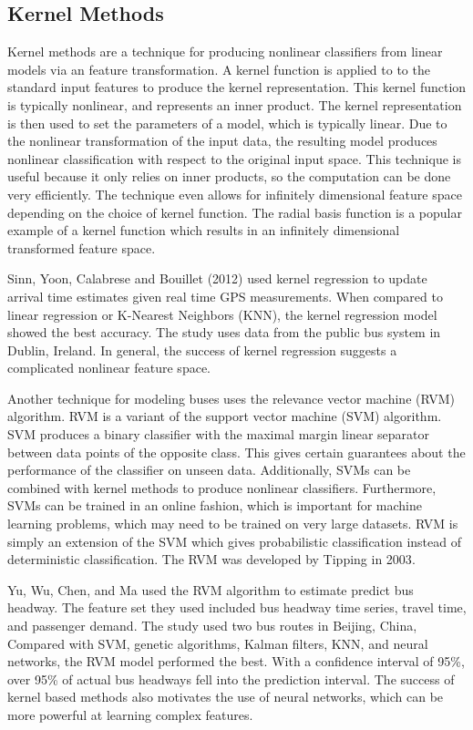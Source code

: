 \subsection{Kernel Methods}

Kernel methods are a technique for producing nonlinear classifiers from linear models via an feature transformation.
A kernel function is applied to to the standard input features to produce the kernel representation.
This kernel function is typically nonlinear, and represents an inner product.
The kernel representation is then used to set the parameters of a model, which is typically linear.
Due to the nonlinear transformation of the input data, the resulting model produces nonlinear classification with respect to the original input space.
This technique is useful because it only relies on inner products, so the computation can be done very efficiently.
The technique even allows for infinitely dimensional feature space depending on the choice of kernel function.
The radial basis function is a popular example of a kernel function which results in an infinitely dimensional transformed feature space.

Sinn, Yoon, Calabrese and Bouillet (2012) used kernel regression to update arrival time estimates given real time GPS measurements\cite{sinn2012predicting}.
When compared to linear regression or K-Nearest Neighbors (KNN), the kernel regression model showed the best accuracy.
The study uses data from the public bus system in Dublin, Ireland.
In general, the success of kernel regression suggests a complicated nonlinear feature space.

Another technique for modeling buses uses the relevance vector machine (RVM) algorithm.
RVM is a variant of the support vector machine (SVM) algorithm.
SVM produces a binary classifier with the maximal margin linear separator between data points of the opposite class.
This gives certain guarantees about the performance of the classifier on unseen data.
Additionally, SVMs can be combined with kernel methods to produce nonlinear classifiers.
Furthermore, SVMs can be trained in an online fashion, which is important for machine learning problems, which may need to be trained on very large datasets.
RVM is simply an extension of the SVM which gives probabilistic classification instead of deterministic classification.
The RVM was developed by Tipping in 2003\cite{tipping2003relevance}.

Yu, Wu, Chen, and Ma used the RVM algorithm to estimate predict bus headway\cite{yu2017probabilistic}.
The feature set they used included bus headway time series, travel time, and passenger demand.
The study used two bus routes in Beijing, China,
Compared with SVM, genetic algorithms, Kalman filters, KNN, and neural networks, the RVM model performed the best.
With a confidence interval of 95\%, over 95\% of actual bus headways fell into the prediction interval.
The success of kernel based methods also motivates the use of neural networks, which can be more powerful at learning complex features.

